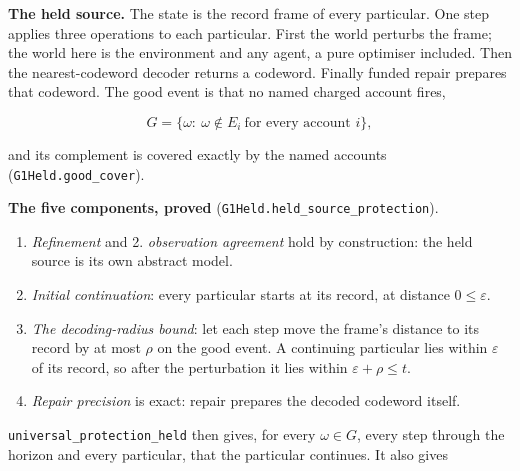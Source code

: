 \documentclass[
]{article}
\providecommand{\tightlist}{%
  \setlength{\itemsep}{0pt}\setlength{\parskip}{0pt}}
\begin{document}
\textbf{The held source.} The state is the record frame of every
particular. One step applies three operations to each particular. First
the world perturbs the frame; the world here is the environment and any
agent, a pure optimiser included. Then the nearest-codeword decoder
returns a codeword. Finally funded repair prepares that codeword. The
good event is that no named charged account fires,

\[
G=\{\omega:\ \omega\notin E_i\ \text{for every account } i\},
\]

and its complement is covered exactly by the named accounts
(\texttt{G\allowbreak{}1\allowbreak{}H\allowbreak{}e\allowbreak{}l\allowbreak{}d\allowbreak{}.\allowbreak{}g\allowbreak{}o\allowbreak{}o\allowbreak{}d\allowbreak{}\_\allowbreak{}c\allowbreak{}o\allowbreak{}v\allowbreak{}e\allowbreak{}r}).

\textbf{The five components, proved}
(\texttt{G\allowbreak{}1\allowbreak{}H\allowbreak{}e\allowbreak{}l\allowbreak{}d\allowbreak{}.\allowbreak{}h\allowbreak{}e\allowbreak{}l\allowbreak{}d\allowbreak{}\_\allowbreak{}s\allowbreak{}o\allowbreak{}u\allowbreak{}r\allowbreak{}c\allowbreak{}e\allowbreak{}\_\allowbreak{}p\allowbreak{}r\allowbreak{}o\allowbreak{}t\allowbreak{}e\allowbreak{}c\allowbreak{}t\allowbreak{}i\allowbreak{}o\allowbreak{}n}).

\begin{enumerate}
\def\labelenumi{\arabic{enumi}.}
\tightlist
\item
  \emph{Refinement} and 2. \emph{observation agreement} hold by
  construction: the held source is its own abstract model.
\item
  \emph{Initial continuation}: every particular starts at its record, at
  distance \(0\le\varepsilon\).
\item
  \emph{The decoding-radius bound}: let each step move the frame's
  distance to its record by at most \(\rho\) on the good event. A
  continuing particular lies within \(\varepsilon\) of its record, so
  after the perturbation it lies within \(\varepsilon+\rho\le t\).
\item
  \emph{Repair precision} is exact: repair prepares the decoded codeword
  itself.
\end{enumerate}

\texttt{u\allowbreak{}n\allowbreak{}i\allowbreak{}v\allowbreak{}e\allowbreak{}r\allowbreak{}s\allowbreak{}a\allowbreak{}l\allowbreak{}\_\allowbreak{}p\allowbreak{}r\allowbreak{}o\allowbreak{}t\allowbreak{}e\allowbreak{}c\allowbreak{}t\allowbreak{}i\allowbreak{}o\allowbreak{}n\allowbreak{}\_\allowbreak{}h\allowbreak{}e\allowbreak{}l\allowbreak{}d}
then gives, for every \(\omega\in G\), every step through the horizon
and every particular, that the particular continues. It also gives
\end{document}
